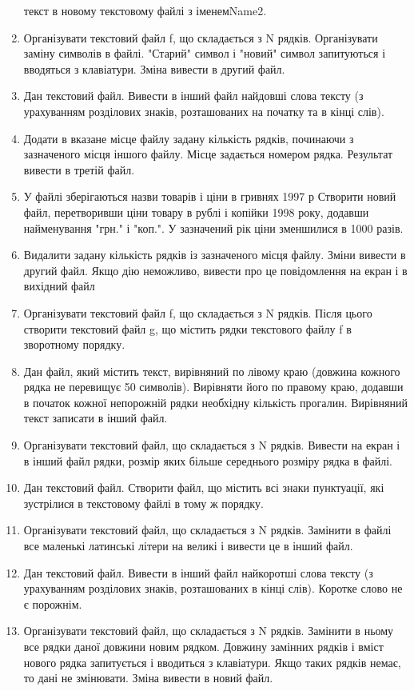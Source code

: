 \documentclass[]{article}
\begin{document}
\begin{enumerate}
  текст в новому текстовому файлі з іменемName2.
\item
  Організувати текстовий файл f, що складається з N рядків. Організувати
  заміну символів в файлі. "Старий" символ і "новий" символ запитуються
  і вводяться з клавіатури. Зміна вивести в другий файл.
\item
  Дан текстовий файл. Вивести в інший файл найдовші слова тексту (з
  урахуванням розділових знаків, розташованих на початку та в кінці
  слів).
\item
  Додати в вказане місце файлу задану кількість рядків, починаючи з
  зазначеного місця іншого файлу. Місце задається номером рядка.
  Результат вивести в третій файл.
\item
  У файлі зберігаються назви товарів і ціни в гривнях 1997 р Створити
  новий файл, перетворивши ціни товару в рублі і копійки 1998 року,
  додавши найменування "грн." і "коп.". У зазначений рік ціни зменшилися
  в 1000 разів.
\item
  Видалити задану кількість рядків із зазначеного місця файлу. Зміни
  вивести в другий файл. Якщо дію неможливо, вивести про це повідомлення
  на екран і в вихідний файл
\item
  Організувати текстовий файл f, що складається з N рядків. Після цього
  створити текстовий файл g, що містить рядки текстового файлу f в
  зворотному порядку.
\item
  Дан файл, який містить текст, вирівняний по лівому краю (довжина
  кожного рядка не перевищує 50 символів). Вирівняти його по правому
  краю, додавши в початок кожної непорожній рядки необхідну кількість
  прогалин. Вирівняний текст записати в інший файл.
\item
  Організувати текстовий файл, що складається з N рядків. Вивести на
  екран і в інший файл рядки, розмір яких більше середнього розміру
  рядка в файлі.
\item
  Дан текстовий файл. Створити файл, що містить всі знаки пунктуації,
  які зустрілися в текстовому файлі в тому ж порядку.
\item
  Організувати текстовий файл, що складається з N рядків. Замінити в
  файлі все маленькі латинські літери на великі і вивести це в інший
  файл.
\item
  Дан текстовий файл. Вивести в інший файл найкоротші слова тексту (з
  урахуванням розділових знаків, розташованих в кінці слів). Коротке
  слово не є порожнім.
\item
  Організувати текстовий файл, що складається з N рядків. Замінити в
  ньому все рядки даної довжини новим рядком. Довжину замінних рядків і
  вміст нового рядка запитується і вводиться з клавіатури. Якщо таких
  рядків немає, то дані не змінювати. Зміна вивести в новий файл.
\end{enumerate}
\end{document}
